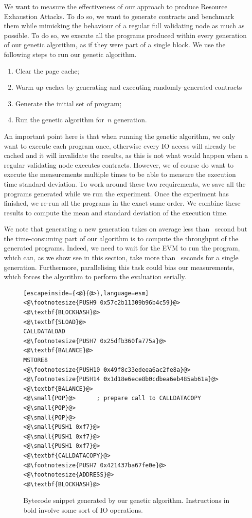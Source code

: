We want to measure the effectiveness of our approach to produce Resource Exhaustion Attacks. To do so, we want to generate contracts and benchmark them while mimicking the behaviour of a regular full validating node as much as possible. To do so, we execute all the programs produced within every generation of our genetic algorithm, as if they were part of a single block. We use the following steps to run our genetic algorithm.

\begin{enumerate}
\item Clear the page cache;
\item Warm up caches by generating and executing randomly-generated contracts
\item Generate the initial set of program;
\item Run the genetic algorithm for~$n$ generation.
\end{enumerate}
%
An important point here is that when running the genetic algorithm, we only want to execute each program once, otherwise every IO access will already be cached and it will invalidate the results, as this is not what would happen when a regular validating node executes contracts. However, we of course do want to execute the measurements multiple times to be able to measure the execution time standard deviation. To work around these two requirements, we save all the programs generated while we run the experiment. Once the experiment has finished, we re-run all the programs in the exact same order. We combine these results to compute the mean and standard deviation of the execution time.

We note that generating a new generation takes on average less than~ second but the time-consuming part of our algorithm is to compute the throughput of the generated programs. Indeed, we need to wait for the EVM to run the program, which can, as we show see in this section, take more than~ seconds for a single generation. Furthermore, parallelising this task could bias our measurements, which forces the algorithm to perform the evaluation serially.

\begin{figure}
\begin{lstlisting}[escapeinside={<@}{@>},language=esm]
<@\footnotesize{PUSH9 0x57c2b11309b96b4c59}@>
<@\textbf{BLOCKHASH}@>
<@\textbf{SLOAD}@>
CALLDATALOAD
<@\footnotesize{PUSH7 0x25dfb360fa775a}@>
<@\textbf{BALANCE}@>
MSTORE8
<@\footnotesize{PUSH10 0x49f8c33edeea6ac2fe8a}@>
<@\footnotesize{PUSH14 0x1d18e6ece8b0cdbea6eb485ab61a}@>
<@\textbf{BALANCE}@>
<@\small{POP}@>      ; prepare call to CALLDATACOPY
<@\small{POP}@>
<@\small{POP}@>
<@\small{PUSH1 0xf7}@>
<@\small{PUSH1 0xf7}@>
<@\small{PUSH1 0xf7}@>
<@\textbf{CALLDATACOPY}@>
<@\footnotesize{PUSH7 0x421437ba67fe0e}@>
<@\footnotesize{ADDRESS}@>
<@\textbf{BLOCKHASH}@>
\end{lstlisting}
  \caption{Bytecode snippet generated by our genetic algorithm. Instructions in bold involve some sort of IO operations.}
  \label{list:generated-code}
\end{figure}

